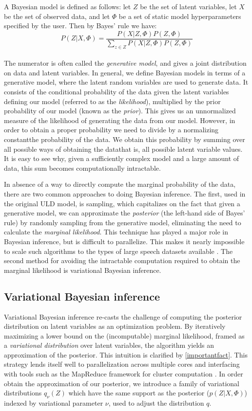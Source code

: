 \documentclass[12pt,letterpaper]{article}
\begin{document}
A Bayesian model is defined as follows: let $Z$ be the set of latent variables, let $X$ be the set of observed data, and let $\Phi$ be a set of static model hyperparameters specified by the user. Then by Bayes' rule we have: $$P(Z|X, \Phi) = \frac{P(X|Z, \Phi)P(Z, \Phi)}{\sum\limits_{ z \in Z} P(X|Z, \Phi)P(Z, \Phi)}$$\\ The numerator is often called the \textit{generative model}, and gives a joint distribution on data and latent variables. In general, we define Bayesian models in terms of a generative model, where the latent random variables are used to generate data. It consists of the conditional probability of the data given the latent variables defining our model (referred to as the \textit{likelihood}), multiplied by the prior probability of our model (known as the \textit{prior}). This gives us an unnormalized measure of the likelihood of generating the data from our model. However, in order to obtain a proper probability we need to divide by a normalizing constant\textemdash the probability of the data. We obtain this probability by summing over all possible ways of obtaining the data\textemdash that is, all possible latent variable values. It is easy to see why, given a sufficiently complex model and a large amount of data, this sum becomes computationally intractable. 

In absence of a way to directly compute the marginal probability of the data, there are two common approaches to doing Bayesian inference. The first, used in the original ULD model, is sampling, which capitalizes on the fact that given a generative model, we can approximate the \textit{posterior} (the left-hand side of Bayes' rule) by randomly sampling from the generative model, eliminating the need to calculate the \textit{marginal likelihood}. This technique has played a major role in Bayesian inference, but is difficult to parallelize. This makes it nearly impossible to scale such algorithms to the types of large speech datasets available \citep{blei:2017}. The second method for avoiding the intractable computation required to obtain the marginal likelihood is variational Bayesian inference. 

\subsection{Variational Bayesian inference}
Variational Bayesian inference re-casts the challenge of computing the posterior distribution on latent variables as an optimization problem. By iteratively maximizing a lower bound on the (incomputable) marginal likelihood, framed as a \textit{variational distribution} over latent variables, the algorithm yields an approximation of the posterior. This intuition is clarified by \hyperref[importantfact]{\eqref{importantfact}}. This strategy lends itself well to parallelization across multiple cores and interfacing with tools such as the MapReduce framework for cluster computation \citep{zhai:2012}. In order obtain the approximation of our posterior, we introduce a family of variational distributions $q_{\nu}(Z)$ which have the same support as the posterior ($p(Z|X, \Phi)$) indexed by variational parameter $\nu$, used to adjust the distribution $q$. 
\end{document}
